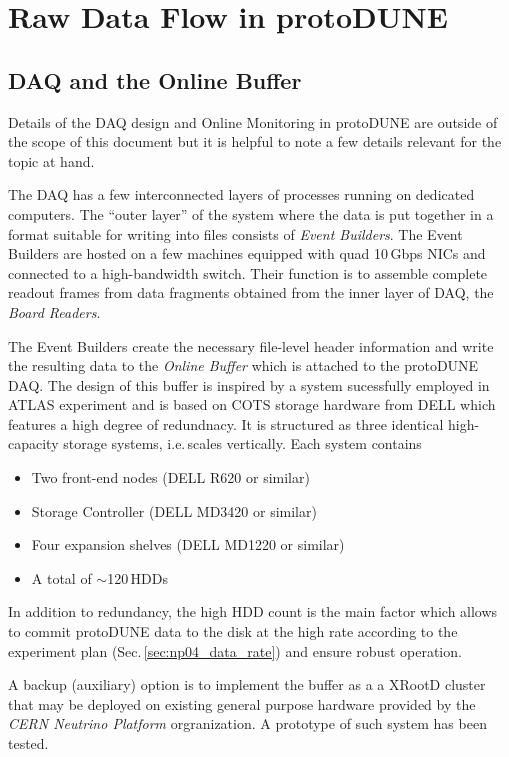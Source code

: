 \documentclass[a4paper]{jpconf}
\newcommand{\pd}{protoDUNE\xspace}
\begin{document}
\section{Raw Data Flow in \pd}
\label{sec:raw_concept}
\subsection{DAQ and the Online Buffer}
Details of the DAQ design and Online Monitoring in \pd are outside of the scope
of this document but it is helpful to note a few details relevant for the topic at hand.

The DAQ has a few interconnected layers of processes running on dedicated computers.
The ``outer layer'' of the system where the data is put together in a format
suitable for writing into files consists of  \textit{Event Builders}. The Event Builders
are hosted on a few machines equipped with quad 10\,Gbps NICs and connected to a high-bandwidth switch.
Their function is to assemble complete readout frames from data
fragments obtained from the inner layer of DAQ, the \textit{Board Readers}.

The Event Builders create the necessary file-level header information and write the
resulting data  to the \textit{Online Buffer} which is attached to the \pd DAQ. 
The design of this buffer is inspired by a system sucessfully employed in ATLAS experiment
and is based on COTS storage hardware from DELL which features a high degree of redundnacy.
It is structured as three identical high-capacity storage systems, i.e.\,scales vertically.
Each system contains
\begin{itemize}

\item Two front-end nodes (DELL R620 or similar)
\item Storage Controller (DELL MD3420 or similar)
\item Four expansion shelves (DELL MD1220 or similar)
\item A total of $\sim$120\,HDDs
\end{itemize}

\noindent In addition to redundancy, the high HDD count is the main factor which allows
to commit \pd data to the disk at the high rate according to the experiment plan
(Sec.\,\ref{sec:np04_data_rate}) and ensure robust operation.


A backup (auxiliary) option is to implement the buffer as a a XRootD \cite{xrootd} cluster
that may be deployed on existing general purpose hardware provided by the \textit{CERN
Neutrino Platform} orgranization.
A prototype of such system has been tested.
\end{document}
